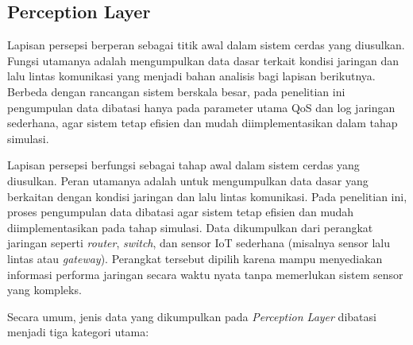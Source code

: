 \documentclass[a4paper,conference]{IEEEtran}
\begin{document}

\subsection{Perception Layer}
Lapisan persepsi berperan sebagai titik awal dalam sistem cerdas yang diusulkan. Fungsi utamanya adalah mengumpulkan data dasar terkait kondisi jaringan dan lalu lintas komunikasi yang menjadi bahan analisis bagi lapisan berikutnya. Berbeda dengan rancangan sistem berskala besar, pada penelitian ini pengumpulan data dibatasi hanya pada parameter utama QoS dan log jaringan sederhana, agar sistem tetap efisien dan mudah diimplementasikan dalam tahap simulasi.

Lapisan persepsi berfungsi sebagai tahap awal dalam sistem cerdas yang diusulkan. 
Peran utamanya adalah untuk mengumpulkan data dasar yang berkaitan dengan kondisi jaringan dan lalu lintas komunikasi. 
Pada penelitian ini, proses pengumpulan data dibatasi agar sistem tetap efisien dan mudah diimplementasikan pada tahap simulasi. 
Data dikumpulkan dari perangkat jaringan seperti \textit{router}, \textit{switch}, dan sensor IoT sederhana (misalnya sensor lalu lintas atau \textit{gateway}). 
Perangkat tersebut dipilih karena mampu menyediakan informasi performa jaringan secara waktu nyata tanpa memerlukan sistem sensor yang kompleks.

Secara umum, jenis data yang dikumpulkan pada \textit{Perception Layer} dibatasi menjadi tiga kategori utama:
\end{document}
